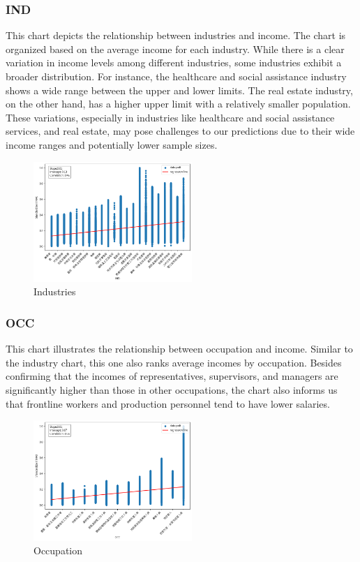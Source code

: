 \documentclass[twocolumn]{article}
\begin{document}
		\subsubsection{IND}
This chart depicts the relationship between industries and income. The chart is organized based on the average income for each industry. While there is a clear variation in income levels among different industries, some industries exhibit a broader distribution. For instance, the healthcare and social assistance industry shows a wide range between the upper and lower limits. The real estate industry, on the other hand, has a higher upper limit with a relatively smaller population.
These variations, especially in industries like healthcare and social assistance services, and real estate, may pose challenges to our predictions due to their wide income ranges and potentially lower sample sizes.
		\begin{figure}[H]
		\centering
		\includegraphics[width=6cm]{IND.png} 
		\caption{Industries} 
		\label{Fig.IND} 
		\end{figure}
		
		\subsubsection{OCC}
This chart illustrates the relationship between occupation and income. Similar to the industry chart, this one also ranks average incomes by occupation. Besides confirming that the incomes of representatives, supervisors, and managers are significantly higher than those in other occupations, the chart also informs us that frontline workers and production personnel tend to have lower salaries.
		\begin{figure}[H]
		\centering
		\includegraphics[width=6cm]{OCC.png} 
		\caption{Occupation} 
		\label{Fig.OCC} 
		\end{figure}
		
\end{document}
